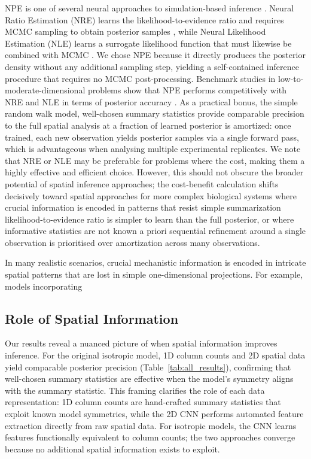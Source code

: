 \documentclass{article}
\providecommand{\DIFaddtex}[1]{{\protect\color{blue} \sf #1}} %
\providecommand{\DIFdeltex}[1]{{\protect\color{red} \scriptsize #1}} %
\providecommand{\DIFaddbegin}{} %
\providecommand{\DIFaddend}{} %
\providecommand{\DIFdelbegin}{} %
\providecommand{\DIFdelend}{} %
\providecommand{\DIFadd}[1]{\texorpdfstring{\DIFaddtex{#1}}{#1}} %
\providecommand{\DIFdel}[1]{\texorpdfstring{\DIFdeltex{#1}}{}} %
\newcommand{\DIFscaledelfig}{0.5}
\newlength{\DIFdelgraphicswidth} %
\newlength{\DIFdelgraphicsheight} %
\newcommand{\DIFaddincludegraphics}[2][]{{\color{blue}\fbox{\DIFOincludegraphics[#1]{#2}}}} %
\newcommand{\DIFdelincludegraphics}[2][]{%
\sbox{\DIFdelgraphicsbox}{\DIFOincludegraphics[#1]{#2}}%
\settoboxwidth{\DIFdelgraphicswidth}{\DIFdelgraphicsbox} %
\settoboxtotalheight{\DIFdelgraphicsheight}{\DIFdelgraphicsbox} %
\scalebox{\DIFscaledelfig}{%
\parbox[b]{\DIFdelgraphicswidth}{\usebox{\DIFdelgraphicsbox}\\[-\baselineskip] \rule{\DIFdelgraphicswidth}{0em}}\llap{\resizebox{\DIFdelgraphicswidth}{\DIFdelgraphicsheight}{%
\setlength{\unitlength}{\DIFdelgraphicswidth}%
\begin{picture}(1,1)%
\thicklines\linethickness{2pt} %
{\color[rgb]{1,0,0}\put(0,0){\framebox(1,1){}}}%
{\color[rgb]{1,0,0}\put(0,0){\line( 1,1){1}}}%
{\color[rgb]{1,0,0}\put(0,1){\line(1,-1){1}}}%
\end{picture}%
}\hspace*{3pt}}} %
} %
\DeclareRobustCommand{\DIFaddbegin}{\DIFOaddbegin \let\includegraphics\DIFaddincludegraphics} %
\DeclareRobustCommand{\DIFaddend}{\DIFOaddend \let\includegraphics\DIFOincludegraphics} %
\DeclareRobustCommand{\DIFdelbegin}{\DIFOdelbegin \let\includegraphics\DIFdelincludegraphics} %
\DeclareRobustCommand{\DIFdelend}{\DIFOaddend \let\includegraphics\DIFOincludegraphics} %
\begin{document}
\DIFadd{NPE is one of several neural approaches to simulation-based inference \citep{Cranmer2020FrontierSBI,2025arXiv250812939D}. Neural Ratio Estimation (NRE) learns the likelihood-to-evidence ratio and requires MCMC sampling to obtain posterior samples \citep{hermans2020likelihood}, while Neural Likelihood Estimation (NLE) learns a surrogate likelihood function that must likewise be combined with MCMC \citep{papamakarios2019sequential}. We chose NPE because it directly produces the posterior density without any additional sampling step, yielding a self-contained inference procedure that requires no MCMC post-processing. Benchmark studies in low-to-moderate-dimensional problems show that NPE performs competitively with NRE and NLE in terms of posterior accuracy \citep{lueckmann2021benchmarking}. As a practical bonus, }\DIFaddend the \DIFdelbegin \DIFdel{simple random walk model, well-chosen summary statistics provide comparable precision to the full spatial analysis at a fraction of }\DIFdelend \DIFaddbegin \DIFadd{learned posterior is amortized: once trained, each new observation yields posterior samples via a single forward pass, which is advantageous when analysing multiple experimental replicates. We note that NRE or NLE may be preferable for problems where }\DIFaddend the \DIFdelbegin \DIFdel{cost, making them a highly effective and efficient choice. However, this should not obscure the broader potential of spatial inference approaches; the cost-benefit calculation shifts decisively toward spatial approaches for more complex biological systems where crucial information is encoded in patterns that resist simple summarization}\DIFdelend \DIFaddbegin \DIFadd{likelihood-to-evidence ratio is simpler to learn than the full posterior}\DIFaddend , or where \DIFdelbegin \DIFdel{informative statistics are not known a priori}\DIFdelend \DIFaddbegin \DIFadd{sequential refinement around a single observation is prioritised over amortization across many observations}\DIFaddend .

\DIFdelbegin \DIFdel{In many realistic scenarios, crucial mechanistic information is encoded in intricate spatial patterns that are lost in simple one-dimensional projections. For example, models incorporating }\DIFdelend \DIFaddbegin \subsection{\DIFadd{Role of Spatial Information}}
\DIFadd{Our results reveal a nuanced picture of when spatial information improves inference. For the original isotropic model, 1D column counts and 2D spatial data yield comparable posterior precision (Table~\ref{tab:all_results}), confirming that well-chosen summary statistics are effective when the model's symmetry aligns with the summary statistic. This framing clarifies the role of each data representation: 1D column counts are hand-crafted summary statistics that exploit known model symmetries, while the 2D CNN performs automated feature extraction directly from raw spatial data. For isotropic models, the CNN learns features functionally equivalent to column counts; the two approaches converge because no additional spatial information exists to exploit.
}
\end{document}
